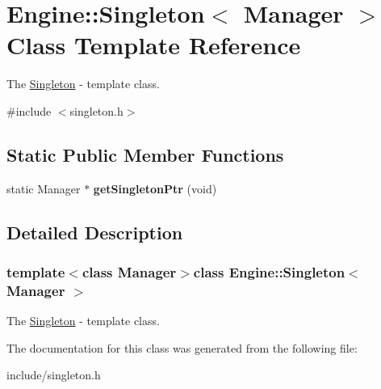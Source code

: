 \hypertarget{classEngine_1_1Singleton}{}\section{Engine\+:\+:Singleton$<$ Manager $>$ Class Template Reference}
\label{classEngine_1_1Singleton}


The \hyperlink{classEngine_1_1Singleton}{Singleton} -\/ template class.  




{\ttfamily \#include $<$singleton.\+h$>$}

\subsection*{Static Public Member Functions}
\begin{DoxyCompactItemize}
\item 
\hypertarget{classEngine_1_1Singleton_ac3a2245ba5ab2afbfd1edaf3a640f4ce}{}static Manager $\ast$ {\bfseries get\+Singleton\+Ptr} (void)\label{classEngine_1_1Singleton_ac3a2245ba5ab2afbfd1edaf3a640f4ce}

\end{DoxyCompactItemize}


\subsection{Detailed Description}
\subsubsection*{template$<$class Manager$>$class Engine\+::\+Singleton$<$ Manager $>$}

The \hyperlink{classEngine_1_1Singleton}{Singleton} -\/ template class. 

The documentation for this class was generated from the following file\+:\begin{DoxyCompactItemize}
\item 
include/singleton.\+h\end{DoxyCompactItemize}

